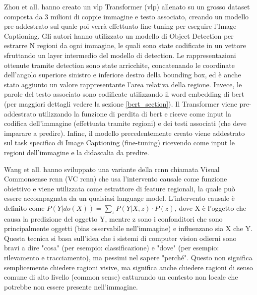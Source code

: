 Zhou et all. \cite{zhou2020unified} \label{unified_model} hanno creato un \acrlong{vlp} Transformer (\acrshort{vlp}) allenato su un grosso dataset composta da 3 milioni di coppie immagine e testo associato, creando un modello pre-addestrato sul quale poi verrà effettuato fine-tuning per eseguire l'Image Captioning.
Gli autori hanno utilizzato un modello di Object Detection per estrarre N regioni da ogni immagine, le quali sono state codificate in un vettore sfruttando un layer intermedio del modello di detection. Le rappresentazioni ottenute tramite detection sono state arricchite, concatenando le coordinate dell'angolo superiore sinistro e inferiore destro della bounding box, ed è anche stato aggiunto un valore rappresentante l'area relativa della regione. Invece, le parole del testo associato sono codificate utilizzando il word embedding di \acrshort{bert} (per maggiori dettagli vedere la sezione \ref{bert_section}). Il Transformer viene pre-addestrato utilizzando la funzione di perdita di \acrshort{bert} e riceve come input la codifica dell'immagine (effettuata tramite regioni) e dei testi associati (che deve imparare a predire). 
Infine, il modello precedentemente creato viene addestrato sul task specifico di Image Captioning (fine-tuning) ricevendo come input le regioni dell'immagine e la didascalia da predire.


Wang et all. \cite{wang2020visual} hanno sviluppato una variante della \acrshort{rcnn} chiamata Visual Commonsense \acrshort{rcnn} (VC \acrshort{rcnn}) che usa l'intervento causale come funzione obiettivo e viene utilizzata come estrattore di feature regionali, la quale può essere accompagnata da un qualsiasi language model.
L'intervento causale è definito come $P(Y|do(X)) = \sum\limits_{z} P(Y|X,z) \cdot P(z)$, dove X è l'oggetto che causa la predizione del oggetto Y, mentre z sono i confonditori che sono principalmente oggetti (bias osservabile nell'immagine) e influenzano sia X che Y. Questa tecnica si basa sull'idea che i sistemi di computer vision odierni sono bravi a dire "cosa" (per esempio: classificazione) e "dove" (per esempio: rilevamento e tracciamento), ma pessimi nel sapere "perché". Questo non significa semplicemente chiedere ragioni visive, ma significa anche chiedere ragioni di senso comune di alto livello (common sense) catturando un contesto non locale che potrebbe non essere presente nell'immagine.


